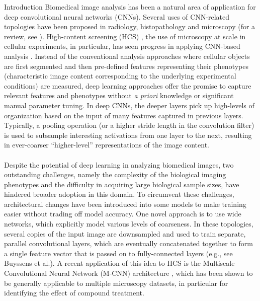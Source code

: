 \begin{section}{Introduction}
	\label{sec:intro}	
	\noindent Biomedical image analysis has been a natural area of application for deep convolutional neural networks (CNNs). Several uses of CNN-related topologies have been proposed in radiology\cite{Arbabshirani2018, Akkus2017}, histopathology \cite{ciresan2013, Litjens2016, Janowczyk2016} and microscopy \cite{Kraus2017, Sommer2017, Ciresan2012} (for a review, see \cite{Litjens2017}). High-content screening (HCS) \cite{Mattiazzi2016, Boutros2015, Singh2014, Scheeder2018, zock2009, assay2014}, the use of microscopy at scale in cellular experiments, in particular, has seen progress in applying CNN-based analysis \cite{Kraus2017, Godinez2017, Godinez2018, Sommer2017, Ando2017}. Instead of the conventional analysis approaches where cellular objects are first segmented and then pre-defined features representing their phenotypes (characteristic image content corresponding to the underlying experimental conditions) are measured, deep learning approaches offer the promise to capture relevant features and phenotypes without \textit{a priori} knowledge or significant manual parameter tuning. In deep CNNs, the deeper layers pick up high-levels of organization based on the input of many features captured in previous layers. Typically, a pooling operation (or a higher stride length in the convolution filter) is used to subsample interesting activations from one layer to the next, resulting in ever-coarser ``higher-level'' representations of the image content.\\\\
	\noindent Despite the potential of deep learning in analyzing biomedical images, two outstanding challenges, namely the complexity of the biological imaging phenotypes and the difficulty in acquiring large biological sample sizes, have hindered broader adoption in this domain. To circumvent these challenges, architectural changes have been introduced into some models to make training easier without trading off model accuracy. One novel approach is to use wide networks, which explicitly model various levels of coarseness. In these topologies, several copies of the input image are downsampled and used to train separate, parallel convolutional layers, which are eventually concatenated together to form a single feature vector that is passed on to fully-connected layers (e.g., see Buyssens et al.\cite{Buyssens2012}). A recent application of this idea to HCS is the Multiscale Convolutional Neural Network (M-CNN) architecture \cite{Godinez2017}, which has been shown to be generally applicable to multiple microscopy datasets, in particular for identifying the effect of compound treatment. \\\\

\end{section}

